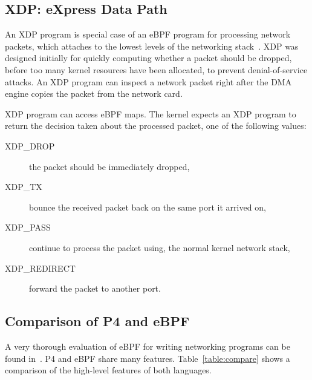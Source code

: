 \subsection{XDP: eXpress Data Path}\label{sec:xdp-background}

An XDP program is special case of an eBPF program for processing
network packets, which attaches to the lowest levels of the networking
stack~\cite{xdpconext18}.  XDP was designed initially for quickly computing whether a
packet should be dropped, before too many kernel resources have been
allocated, to prevent denial-of-service attacks.  An XDP program can
inspect a network packet right after the DMA engine copies the packet
from the network card.

XDP program can access eBPF maps.  The kernel expects an XDP program
to return the decision taken about the processed packet, one of the
following values:

\begin{description}
\item[XDP\_DROP] the packet should be immediately dropped,
\item[XDP\_TX] bounce the received packet back on the same port it arrived on,
\item[XDP\_PASS] continue to process the packet using,
  the normal kernel network stack,
\item[XDP\_REDIRECT] forward the packet to another port.
\end{description}

\subsection{Comparison of P4 and eBPF}

A very thorough evaluation of eBPF for writing networking programs can
be found in~\cite{minao-hspr18}.  P4 and eBPF share many features.
Table~\ref{table:compare} shows a comparison of the high-level
features of both languages.

